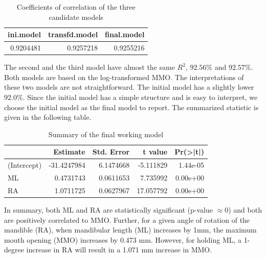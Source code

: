 \documentclass[
]{book}
\newenvironment{Shaded}{\begin{snugshade}}{\end{snugshade}}
\newcommand{\AttributeTok}[1]{\textcolor[rgb]{0.13,0.29,0.53}{#1}}
\newcommand{\FunctionTok}[1]{\textcolor[rgb]{0.13,0.29,0.53}{\textbf{#1}}}
\newcommand{\NormalTok}[1]{#1}
\newcommand{\OtherTok}[1]{\textcolor[rgb]{0.56,0.35,0.01}{#1}}
\newcommand{\SpecialCharTok}[1]{\textcolor[rgb]{0.81,0.36,0.00}{\textbf{#1}}}
\newcommand{\StringTok}[1]{\textcolor[rgb]{0.31,0.60,0.02}{#1}}
\begin{document}
\begin{table}

\caption{\label{tab:unnamed-chunk-83}Coefficients of correlation of the three candidate models}
\centering
\begin{tabular}[t]{r|r|r}
\hline
ini.model & transfd.model & final.model\\
\hline
0.9204481 & 0.9257218 & 0.9255216\\
\hline
\end{tabular}
\end{table}

The second and the third model have almost the same \(R^2\), \(92.56\%\) and \(92.57\%\). Both models are based on the log-transformed MMO. The interpretations of these two models are not straightforward. The initial model has a slightly lower \(92.0\%\). Since the initial model has a simple structure and is easy to interpret, we choose the initial model as the final model to report. The summarized statistic is given in the following table.

\begin{Shaded}
\end{Shaded}

\begin{table}

\caption{\label{tab:unnamed-chunk-84}Summary of the final working model}
\centering
\begin{tabular}[t]{l|r|r|r|r}
\hline
  & Estimate & Std. Error & t value & Pr(>|t|)\\
\hline
(Intercept) & -31.4247984 & 6.1474668 & -5.111829 & 1.44e-05\\
\hline
ML & 0.4731743 & 0.0611653 & 7.735992 & 0.00e+00\\
\hline
RA & 1.0711725 & 0.0627967 & 17.057792 & 0.00e+00\\
\hline
\end{tabular}
\end{table}

In summary, both ML and RA are statistically significant (p-value \(\approx 0\)) and both are positively correlated to MMO. Further, for a given angle of rotation of the mandible (RA), when mandibular length (ML) increases by 1mm, the maximum mouth opening (MMO) increases by 0.473 mm. However, for holding ML, a 1-degree increase in RA will result in a 1.071 mm increase in MMO.
\end{document}
